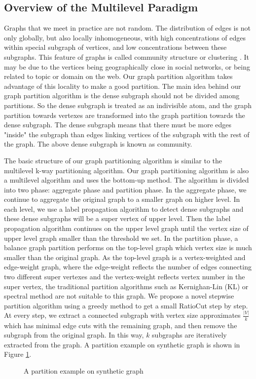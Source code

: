 \documentclass{acm_proc_article-sp}
\begin{document}
\subsection{Overview of the Multilevel Paradigm}
Graphs that we meet in practice are not random. The distribution of edges is not only globally, but also locally inhomogeneous, with high concentrations of edges within special subgraph of vertices, and low concentrations between these subgraphs. This feature of graphs is called community structure or clustering \cite{gn:community}. It may be due to the vertices being geographically close in social networks, or being related to topic or domain on the web. Our graph partition algorithm takes advantage of this locality to make a good partition. The main idea behind our graph partition algorithm is the dense subgraph should not be divided among partitions. So the dense subgraph is treated as an indivisible atom, and the graph partition towards vertexes are transformed into the graph partition towards the dense subgraph. The dense subgraph means that there must be more edges "inside" the subgraph than edges linking vertices of the subgraph with the rest of the graph. The above dense subgraph is known as community.
\par
The basic structure of our graph partitioning algorithm is similar to the multilevel k-way partitioning algorithm. Our graph partitioning algorithm is also a multilevel algorithm and uses the bottom-up method. The algorithm is divided into two phase: aggregate phase and partition phase. In the aggregate phase, we continue to aggregate the original graph to a smaller graph on higher level. In each level, we use a label propagation algorithm to detect dense subgraphs and these dense subgraphs will be a super vertex of upper level. Then the label propagation algorithm continues on the upper level graph until the vertex size of upper level graph smaller than the threshold we set. In the partition phase, a balance graph partition performs on the top-level graph which vertex size is much smaller than the original graph. As the top-level graph is a vertex-weighted and edge-weight graph, where the edge-weight reflects the number of edges connecting two different super vertexes and the vertex-weight reflects vertex number in the super vertex, the traditional partition algorithms such as Kernighan-Lin (KL) or spectral method are not suitable to this graph\cite{kl:partition, barnard:mrsb}. We propose a novel stepwise partition algorithm using a greedy method to get a small RatioCut step by step. At every step, we extract a connected subgraph with vertex size approximates $\frac{|V|}{k}$ which has minimal edge cuts with the remaining graph, and then remove the subgraph from the original graph. In this way, $k$ subgraphs are iteratively extracted from the graph. A partition example on synthetic graph is shown in Figure \ref{fig:partition example}.
\begin{figure}
\centering
{}
\caption{A partition example on synthetic graph}
\label{fig:partition example}
\end{figure}
\end{document}
